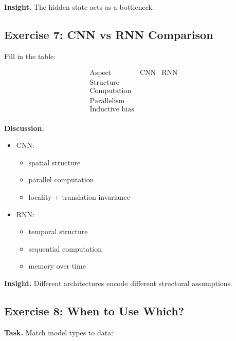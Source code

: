 \medskip

\noindent
\textbf{Insight.}  
The hidden state acts as a bottleneck.

\subsection{Exercise 7: CNN vs RNN Comparison}

Fill in the table:

\[
\begin{array}{c|c|c}
\text{Aspect} & \text{CNN} & \text{RNN} \\
\hline
\text{Structure} & & \\
\text{Computation} & & \\
\text{Parallelism} & & \\
\text{Inductive bias} & & \\
\end{array}
\]

\medskip

\noindent
\textbf{Discussion.}

\begin{itemize}
    \item CNN:
    \begin{itemize}
        \item spatial structure
        \item parallel computation
        \item locality + translation invariance
    \end{itemize}

    \item RNN:
    \begin{itemize}
        \item temporal structure
        \item sequential computation
        \item memory over time
    \end{itemize}
\end{itemize}

\medskip

\noindent
\textbf{Insight.}  
Different architectures encode different structural assumptions.

\subsection{Exercise 8: When to Use Which?}

\textbf{Task.}  
Match model types to data:

